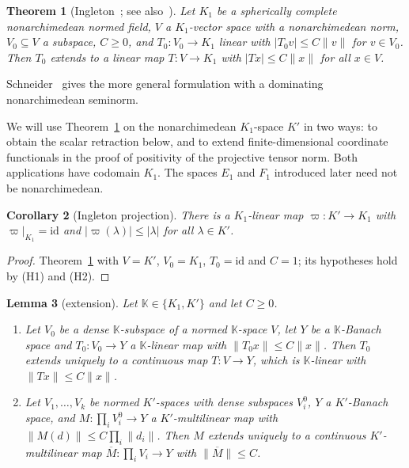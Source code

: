 \documentclass[11pt]{amsart}
\newtheorem{theorem}{Theorem}[section]
\newtheorem{lemma}[theorem]{Lemma}
\newtheorem{corollary}[theorem]{Corollary}
\theoremstyle{definition}
\theoremstyle{remark}
\numberwithin{equation}{section}
\newcommand{\id}{\mathrm{id}}
\newcommand{\abs}[1]{\lvert #1\rvert}
\newcommand{\norm}[1]{\lVert #1\rVert}
\theoremstyle{plain}
\theoremstyle{definition}
\theoremstyle{plain}
\begin{document}
\begin{theorem}[Ingleton~\cite{In}; see also~\cite{vR}]\label{thm:ingleton}
Let $K_1$ be a spherically complete nonarchimedean normed field, $V$ a $K_1$\nobreakdash-vector space with a nonarchimedean norm,
$V_0\subseteq V$ a subspace, $C\ge0$, and $T_0\colon V_0\to K_1$ linear with $\abs{T_0v}\le C\norm v$ for $v\in V_0$. Then
$T_0$ extends to a linear map $T\colon V\to K_1$ with $\abs{Tx}\le C\norm x$ for all $x\in V$.
\end{theorem}

Schneider~\cite[Prop.~9.2]{Sch} gives the more general formulation with a dominating nonarchimedean seminorm.

We will use Theorem~\ref{thm:ingleton} on the nonarchimedean $K_1$\nobreakdash-space $K'$ in two ways: to obtain the scalar
retraction below, and to extend finite-dimensional coordinate functionals in the proof of positivity of the
projective tensor norm. Both applications have codomain $K_1$. The spaces $E_1$ and $F_1$ introduced later need not
be nonarchimedean.

\begin{corollary}[Ingleton projection]\label{cor:proj}
There is a $K_1$\nobreakdash-linear map $\varpi\colon K'\to K_1$ with $\varpi|_{K_1}=\id$ and $\abs{\varpi(\lambda)}\le\abs\lambda$ for all
$\lambda\in K'$.
\end{corollary}

\begin{proof}
Theorem~\ref{thm:ingleton} with $V=K'$, $V_0=K_1$, $T_0=\id$ and $C=1$; its hypotheses hold by (H1) and (H2).
\end{proof}

\begin{samepage}
\begin{lemma}[extension]\label{lem:ext}
Let $\mathbb K\in\{K_1,K'\}$ and let $C\ge0$.
\begin{enumerate}
\item Let $V_0$ be a dense $\mathbb K$\nobreakdash-subspace of a normed $\mathbb K$\nobreakdash-space $V$, let $Y$ be a
$\mathbb K$\nobreakdash-Banach space and $T_0\colon V_0\to Y$ a $\mathbb K$\nobreakdash-linear map with $\norm{T_0x}\le C\norm x$. Then $T_0$ extends
uniquely to a continuous map $T\colon V\to Y$, which is $\mathbb K$\nobreakdash-linear with $\norm{Tx}\le C\norm x$.
\item Let $V_1,\dots,V_k$ be normed $K'$\nobreakdash-spaces with dense subspaces $V_i^0$, $Y$ a $K'$\nobreakdash-Banach space, and
$M\colon\prod_iV_i^0\to Y$ a $K'$\nobreakdash-multilinear map with $\norm{M(d)}\le C\prod_i\norm{d_i}$. Then $M$ extends uniquely to a
continuous $K'$\nobreakdash-multilinear map $\overline M\colon\prod_iV_i\to Y$ with $\norm{\overline M}\le C$.
\end{enumerate}
\end{lemma}
\end{samepage}
\end{document}
